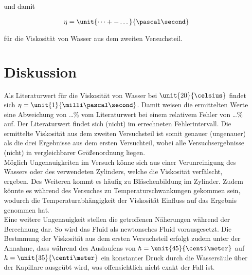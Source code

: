 \noindent und damit

\begin{align*}
\eta = \unit{\dots+-\dots}{\pascal\second}
\end{align*}

\noindent für die Viskosität von Wasser aus dem zweiten Versuchsteil.

\section{Diskussion}
\label{sec:diskussion}

Als Literaturwert für die Viskosität von Wasser bei $\unit{20}{\celsius}$ findet sich $\eta = \unit{1}{\milli\pascal\second}$. Damit weisen die ermittelten Werte eine Abweichung von \dots\% vom Literaturwert bei einem relativem Fehler von \dots\% auf. Der Literaturwert findet sich (nicht) im errechneten Fehlerintervall. Die ermittelte Viskosität aus dem zweiten Versuchsteil ist somit genauer (ungenauer) als die drei Ergebnisse aus dem ersten Versuchteil, wobei alle Versuchsergebnisse (nicht) in vergleichbarer Größenordnung liegen.\\
Möglich Ungenauigkeiten im Versuch könne sich aus einer Verunreinigung des Wassers oder des verwendeten Zylinders, welche die Viskosität verfälscht, ergeben. Des Weiteren kommt es häufig zu Bläschenbildung im Zylinder. Zudem könnte es während des Versuches zu Temperaturschwankungen gekommen sein, wodurch die Temperaturabhängigkeit der Viskosität Einfluss auf das Ergebnis genommen hat.\\
Eine weitere Ungenauigkeit stellen die getroffenen Näherungen während der Berechnung dar. So wird das Fluid als newtonsches Fluid vorausgesetzt. Die Bestmmung der Viskosität aus dem ersten Versuchsteil erfolgt zudem unter der Annahme, dass während des Auslaufens von $h=\unit{45}{\centi\meter}$ auf $h=\unit{35}{\centi\meter}$ ein konstanter Druck durch die Wassersäule über der Kapillare ausgeübt wird, was offensichtlich nicht exakt der Fall ist.